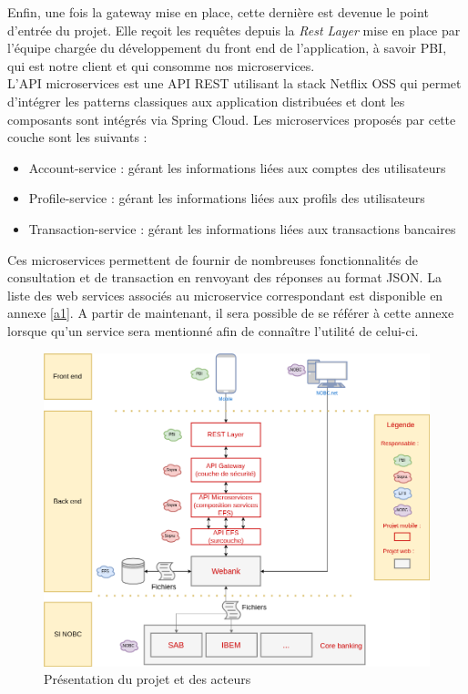 	Enfin, une fois la gateway mise en place, cette dernière est devenue le point d'entrée du projet. Elle reçoit les requêtes depuis la \textit{Rest Layer} mise en place par l'équipe chargée du développement du front end de l'application, à savoir PBI, qui est notre client et qui consomme nos microservices. \\

	L'API microservices est une API REST utilisant la stack Netflix OSS qui permet d'intégrer les patterns classiques aux application distribuées et dont les composants sont intégrés via Spring Cloud. Les microservices proposés par cette couche sont les suivants :\\

\begin{itemize}
			\item Account-service : gérant les informations liées aux comptes des utilisateurs
			\item Profile-service : gérant les informations liées aux profils des utilisateurs
			\item Transaction-service : gérant les informations liées aux transactions bancaires \\
\end{itemize}

	Ces microservices permettent de fournir de nombreuses fonctionnalités de consultation et de transaction en renvoyant des réponses au format JSON. La liste des web services associés au microservice correspondant est disponible en annexe \ref{a1}. A partir de maintenant, il sera possible de se référer à cette annexe lorsque qu'un service sera mentionné afin de connaître l'utilité de celui-ci.
	
\begin{figure}[H]
\raggedleft
	\includegraphics[scale=0.45]{images/travailNeuflizeOBC/architecture/archiFonc.png}
	\centering
	\caption{Présentation du projet et des acteurs}
	\label{archiFonc}
\end{figure}